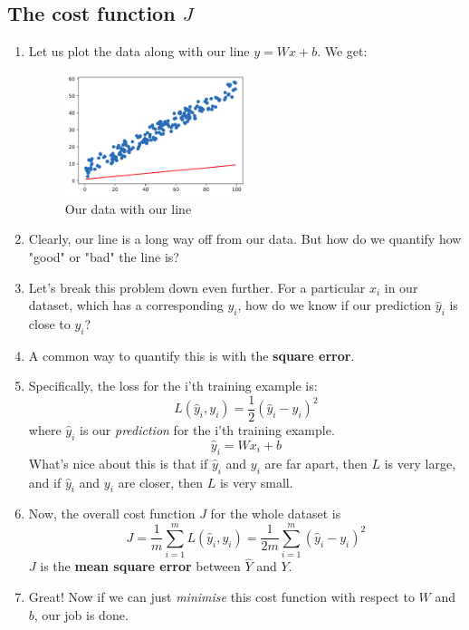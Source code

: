 \documentclass{article}
\begin{document}
        \subsection{The cost function $J$}
            \begin{enumerate}
                \item Let us plot the data along with our line $y = Wx + b$. We get:
                \begin{figure}[h] \begin{center}
                    \includegraphics[width = 0.5\textwidth]{plot2.png}
                    \caption{Our data with our line}
                \end{center} \end{figure}
                \item Clearly, our line is a long way off from our data. But how do we quantify how "good" or "bad" the line is?
                \item Let's break this problem down even further. For a particular $x_i$ in our dataset, which has 
                a corresponding $y_i$, how do we know if our prediction $\hat{y}_i$ is close to $y_i$?
                \item A common way to quantify this is with the \textbf{square error}.
                \item Specifically, the loss for the i'th training example is:
                \[
                  L(\hat{y}_i, y_i) = \frac{1}{2}(\hat{y}_i - y_i)^2  
                \]
                where $\hat{y}_i$ is our \emph{prediction} for the i'th training example.
                \[
                  \hat{y}_i = Wx_i + b  
                \]
                What's nice about this is that if $\hat{y}_i$ and $y_i$ are far apart, then $L$ is very large,
                 and if $\hat{y}_i$ and $y_i$ are closer, then $L$ is very small.
                \item Now, the overall cost function $J$ for the whole dataset is 
                \[
                  J =  \frac{1}{m}\sum_{i = 1}^{m} L(\hat{y}_i, y_i) = \frac{1}{2m}\sum_{i = 1}^{m} (\hat{y}_i - y_i)^2  
                \]
                $J$ is the \textbf{mean square error} between $\hat{Y}$ and $Y$.
                \item Great! Now if we can just \emph{minimise} this cost function with respect to $W$ and $b$, our job is done.
            \end{enumerate}
\end{document}
